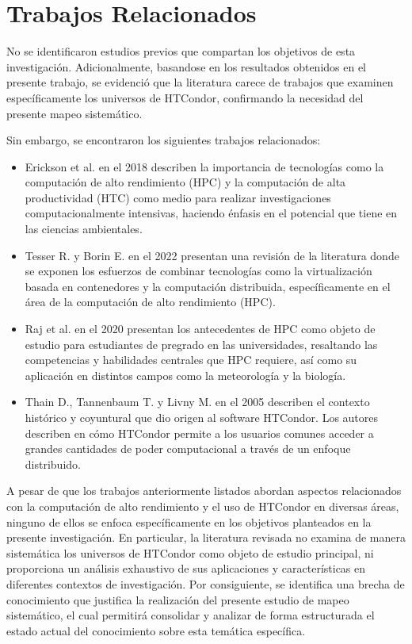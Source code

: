 \section{Trabajos Relacionados}\label{sec:trabajos-relacionados}

No se identificaron estudios previos que compartan los objetivos de
esta investigación. Adicionalmente, basandose en los resultados obtenidos
en el presente trabajo, se evidenció que la literatura carece de trabajos
que examinen específicamente los universos de HTCondor, confirmando
la necesidad del presente mapeo sistemático.

Sin embargo, se encontraron los siguientes trabajos relacionados:

\begin{itemize}[label=\textbf{--}]
	\item Erickson et al. en el 2018 \cite{EricksonA-01} describen la importancia de tecnologías como la computación
	      de alto rendimiento (HPC) y la computación de alta productividad (HTC) como medio para
	      realizar investigaciones computacionalmente intensivas, haciendo énfasis en el potencial
	      que tiene en las ciencias ambientales.

	\item Tesser R. y Borin E. en el 2022 \cite{KellerTesser2023} presentan una revisión de la literatura
	      donde se exponen los esfuerzos de combinar tecnologías como la virtualización basada
	      en contenedores y la computación distribuida, específicamente en el área de la computación
	      de alto rendimiento (HPC).

	\item Raj et al. en el 2020 \cite{RajRomanowski2020} presentan los antecedentes de HPC como objeto de estudio para estudiantes de pregrado en las universidades,
	      resaltando las competencias y habilidades centrales que HPC requiere, así como su aplicación en distintos campos como la meteorología
	      y la biología.

	\item Thain D., Tannenbaum T. y Livny M. en el 2005 \cite{Livny-Tannenbaum2005} describen el contexto histórico y coyuntural que dio
	      origen al software HTCondor. Los autores describen en cómo HTCondor permite a los usuarios comunes
	      acceder a grandes cantidades de poder computacional a través de un enfoque distribuido.
\end{itemize}

A pesar de que los trabajos anteriormente listados abordan aspectos relacionados con la computación
de alto rendimiento y el uso de HTCondor en diversas áreas, ninguno de ellos se enfoca específicamente
en los objetivos planteados en la presente investigación. En particular, la literatura revisada
no examina de manera sistemática los universos de HTCondor como objeto de estudio principal,
ni proporciona un análisis exhaustivo de sus aplicaciones y características en diferentes
contextos de investigación. Por consiguiente, se identifica una brecha de conocimiento que
justifica la realización del presente estudio de mapeo sistemático, el cual permitirá consolidar y
analizar de forma estructurada el estado actual del conocimiento sobre esta temática específica.
